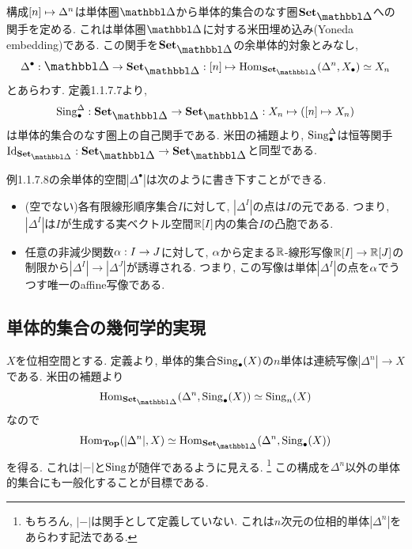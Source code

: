 \documentclass[uplatex, a4paper, 14Q, dvipdfmx]{jsreport}
\begin{document}
\begin{example}
  構成$[n] \mapsto \Delta^n$は単体圏$\csim$から単体的集合のなす圏$\sset$への関手を定める. 
  これは単体圏$\csim$に対する米田埋め込み(Yoneda embedding)である. 
  この関手を$\sset$の余単体的対象とみなし, 
  \begin{align*}
    \Delta^{\bullet}: \csim \to \sset: [n] \mt \Hom_{\sset}(\Delta^n,\X) \simeq X_n
  \end{align*}
  とあらわす. 
  定義1.1.7.7より, 
  \begin{align*}
    \Sing_\bullet^{\Delta}: \sset \to \sset: X_n \mt ([n] \mt X_n)
  \end{align*} 
  は単体的集合のなす圏上の自己関手である.
  米田の補題より, $\mathrm{Sing}_\bullet^{\Delta}$は恒等関手$\Id_{\sset}: \sset \to \sset$と同型である.  
\end{example}

\begin{remark}
  例1.1.7.8の余単体的空間$|\Delta^\bullet|$は次のように書き下すことができる. 
  \begin{itemize}
    \item (空でない)各有限線形順序集合$I$に対して, $|\Delta^I|$の点は$I$の元である. 
    つまり, $|\Delta^I|$は$I$が生成する実ベクトル空間$\mathbb{R}[I]$内の集合$I$の凸胞である. 
    \item 任意の非減少関数$\alpha: I \to J$に対して, $\alpha$から定まる$\mathbb{R}$-線形写像$\mathbb{R}[I] \to \mathbb{R}[J]$の制限から$|\Delta^I| \to |\Delta^J|$が誘導される.
    つまり, この写像は単体$|\Delta^I|$の点を$\alpha$でうつす唯一のaffine写像である.  
  \end{itemize}
\end{remark}

\subsection{単体的集合の幾何学的実現}

$X$を位相空間とする. 
定義より, 単体的集合$\mathrm{Sing}_\bullet(X)$の$n$単体は連続写像$|\Delta^n| \to X$である.
米田の補題より 
\begin{align*}
  \Hom_{\sset}(\Delta^n,\Sing_\bullet(X)) 
  \simeq \Sing_n(X) 
\end{align*}
なので
\begin{align*}
  \Hom_{\Top}(|\Delta^n|,X) \simeq \Hom_{\sset}(\Delta^n,\Sing_\bullet(X)) 
\end{align*}
を得る. 
これは$|-|$と$\mathrm{Sing}$が随伴であるように見える. 
\footnote{
  もちろん, $|-|$は関手として定義していない. 
  これは$n$次元の位相的単体$|\Delta^n|$をあらわす記法である. 
}
この構成を$\Delta^n$以外の単体的集合にも一般化することが目標である. 
\end{document}
